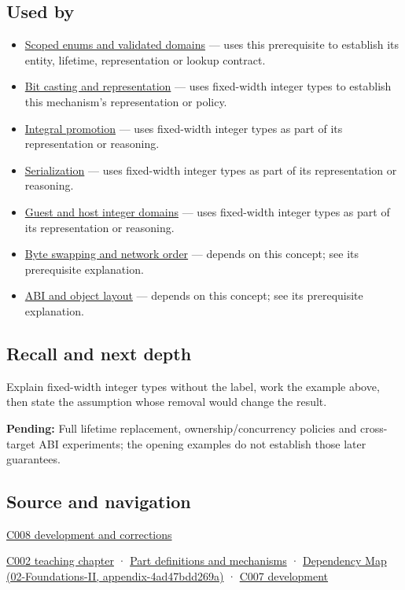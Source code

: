 \subsection{Used by}\label{appendix-cc04044b5782-used-by}

\begin{itemize}
\tightlist
\item
  \hyperref[appendix-23640fcee147]{Scoped enums and validated domains} --- uses this prerequisite to establish its entity, lifetime, representation or lookup contract.
\item
  \hyperref[appendix-34ee45f161c1]{Bit casting and representation} --- uses fixed-width integer types to establish this mechanism's representation or policy.
\item
  \hyperref[appendix-45303d03796a]{Integral promotion} --- uses fixed-width integer types as part of its representation or reasoning.
\item
  \hyperref[appendix-91d09ebed979]{Serialization} --- uses fixed-width integer types as part of its representation or reasoning.
\item
  \hyperref[appendix-33e7a011b684]{Guest and host integer domains} --- uses fixed-width integer types as part of its representation or reasoning.
\item
  \hyperref[appendix-11ba36693aa2]{Byte swapping and network order} --- depends on this concept; see its prerequisite explanation.
\item
  \hyperref[appendix-c4ac6bb0fff8]{ABI and object layout} --- depends on this concept; see its prerequisite explanation.
\end{itemize}

\subsection{Recall and next depth}\label{appendix-cc04044b5782-recall-and-next-depth}

Explain fixed-width integer types without the label, work the example above, then state the assumption whose removal would change the result.

\textbf{Pending:} Full lifetime replacement, ownership/concurrency policies and cross-target ABI experiments; the opening examples do not establish those later guarantees.

\subsection{Source and navigation}\label{appendix-cc04044b5782-source-and-navigation}

\hyperref[appendix-fd090d982a15-m008---parts-113-126]{C008 development and corrections}

\hyperref[01-foundations-i-ch001-arithmetic-becomes-a-policy]{C002 teaching chapter} · \hyperref[appendix-fd090d982a15]{Part definitions and mechanisms} · \href{../02-Foundations-II/main.pdf\#nameddest=appendix-4ad47bdd269a}{Dependency Map (02-Foundations-II, appendix-4ad47bdd269a)} · \hyperref[01-foundations-i-ch002-choose-a-type-for-its-promise-not-its-familiar-size]{C007 development}
